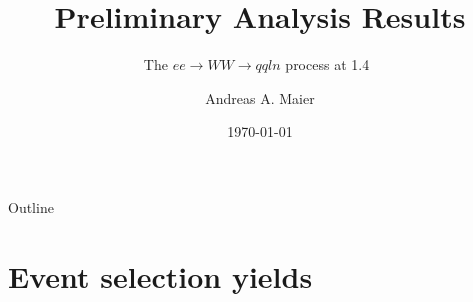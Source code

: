 \documentclass{beamer}
\title{Preliminary Analysis Results}
\subtitle{The $ee \rightarrow WW \rightarrow qqln$ process at 1.4~\TeV}
\author{Andreas A. Maier\inst{1}}
\institute[CERN] %
{
  \inst{1}%
  CERN
}
\date{\today}
\begin{document}
\begin{frame}
  \titlepage
\end{frame}






























\begin{frame}{Outline}
  \begin{multicols}{2}
    \tableofcontents
  \end{multicols}
\end{frame}












\section{Event selection yields}
\end{document}
